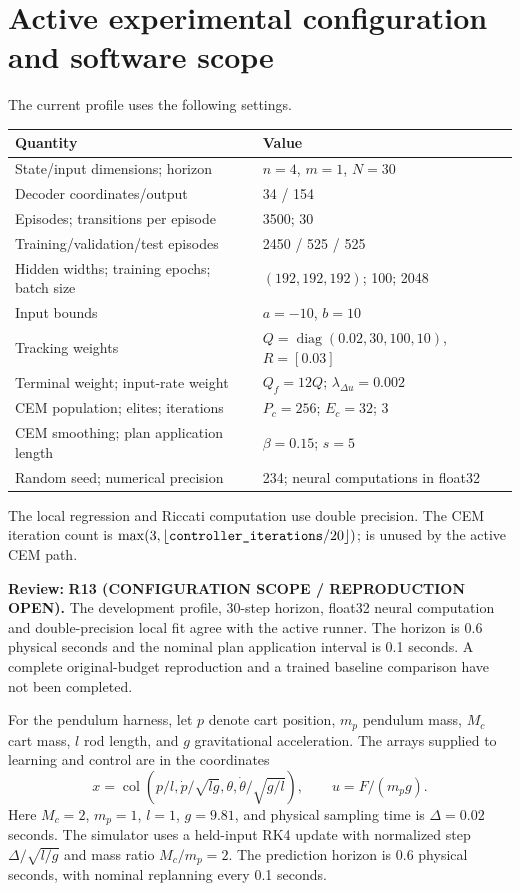 \documentclass[11pt]{article}
\newcommand{\col}{\operatorname{col}}
\newcommand{\review}[1]{\par\noindent\textcolor{red!70!black}{\textbf{Review:} #1}\par}
\newcommand{\code}[1]{\texttt{\detokenize{#1}}}
\begin{document}
\section{Active experimental configuration and software scope}
The current \code{dev} profile uses the following settings.
\begin{center}
\small
\begin{tabular}{@{}ll@{}}
\toprule
Quantity & Value\\\midrule
State/input dimensions; horizon & $n=4$, $m=1$, $N=30$\\
Decoder coordinates/output & 34 / 154\\
Episodes; transitions per episode & 3500; 30\\
Training/validation/test episodes & 2450 / 525 / 525\\
Hidden widths; training epochs; batch size & $(192,192,192)$; 100; 2048\\
Input bounds & $a=-10$, $b=10$\\
Tracking weights & $Q=\operatorname{diag}(0.02,30,100,10)$, $R=[0.03]$\\
Terminal weight; input-rate weight & $Q_f=12Q$; $\lambda_{\Delta u}=0.002$\\
CEM population; elites; iterations & $P_c=256$; $E_c=32$; 3\\
CEM smoothing; plan application length & $\beta=0.15$; $s=5$\\
Random seed; numerical precision & 234; neural computations in float32\\\bottomrule
\end{tabular}
\end{center}
The local regression and Riccati computation use double precision. The CEM iteration count is $\max(3,\lfloor\code{controller_iterations}/20\rfloor)$; \code{controller_lr} is unused by the active CEM path.
\review{\textbf{R13 (CONFIGURATION SCOPE / REPRODUCTION OPEN).} The development profile, 30-step horizon, float32 neural computation and double-precision local fit agree with the active runner. The horizon is 0.6 physical seconds and the nominal plan application interval is 0.1 seconds. A complete original-budget reproduction and a trained baseline comparison have not been completed.}


For the pendulum harness, let $p$ denote cart position, $m_p$ pendulum mass, $M_c$ cart mass, $l$ rod length, and $g$ gravitational acceleration. The arrays supplied to learning and control are in the coordinates
\begin{equation}\label{eq:units}
x=\col\left(p/l,\dot p/\sqrt{lg},\theta,\dot\theta/\sqrt{g/l}\right),\qquad u=F/(m_p g).
\end{equation}
Here $M_c=2$, $m_p=1$, $l=1$, $g=9.81$, and physical sampling time is $\Delta=0.02$ seconds. The simulator uses a held-input RK4 update with normalized step $\Delta/\sqrt{l/g}$ and mass ratio $M_c/m_p=2$. The prediction horizon is 0.6 physical seconds, with nominal replanning every 0.1 seconds.
\end{document}
